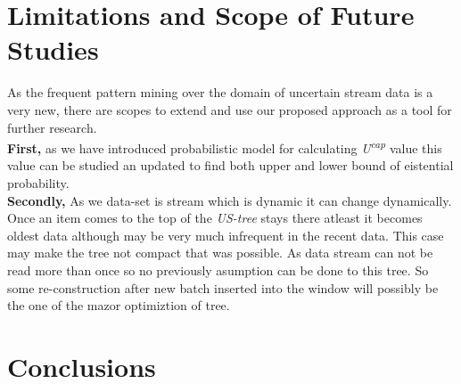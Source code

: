 \section{Limitations and Scope of Future Studies}
As the frequent pattern mining over the domain of uncertain stream data is a very new, there are scopes to extend and use our proposed approach as a tool for further research.\\ 
\textbf{First,} as we have introduced probabilistic model for calculating \emph{U\textsuperscript{cap}} value this value can be studied an updated to find both upper and lower bound of eistential probability.\\
\textbf{Secondly,} As we data-set is stream which is dynamic it can change dynamically. Once an item comes to the top of the \emph{US-tree} stays there atleast it becomes oldest data although may be very much infrequent in the recent data. This case may make the tree not compact that was possible. As data stream can not be read more than once so no previously asumption can be done to this tree. So some re-construction after new batch inserted into the window will possibly be the one of the mazor optimiztion of tree.
\section{Conclusions}